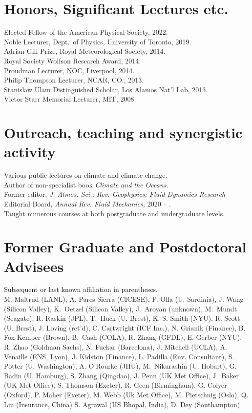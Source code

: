 \documentclass[11pt]{article}
\begin{document}
\section*{Honors, Significant Lectures etc.}
Elected Fellow of the American Physical Society, 2022. \\
Noble Lecturer, Dept.\ of Physics,  University of Toronto, 2019.\\
Adrian Gill Prize, Royal Meteorological Society, 2014. \\
Royal Society Wolfson Research Award, 2014. \\
Proudman Lecturer, NOC, Liverpool, 2014. \\
Philip Thompson Lecturer, NCAR, CO., 2013. \\
Stanislaw Ulam Distinguished Scholar, Los Alamos Nat'l Lab, 2013. \\
Victor Starr Memorial Lecturer, MIT, 2008.


\section*{Outreach, teaching and synergistic activity}
Various public lectures on climate and climate change.\\
Author of non-specialist book \textit{Climate and the Oceans}.\\
Former editor, \textit{J. Atmos. Sci.;  Rev. Geophysics; Fluid Dynamics Research}\\
Editorial Board,  \textit{Annual Rev. Fluid Mechanics,} 2020 -- .  \\  
Taught numerous courses at both postgraduate and undergraduate levels.


\section*{Former Graduate and Postdoctoral Advisees} 
Subsequent or last known affiliation in parentheses. \\
M. Maltrud (LANL), A. Pares-Sierra (CICESE), P. Olla (U. Sardinia), J. Wang (Silicon Valley), K.~Oetzel (Silicon Valley), J.~Aroyan (unknown), M.~Mundt (Seagate), R. Raskin (JPL), T.~Huck (U. Brest), K. S. Smith (NYU), R. Scott (U. Brest), J. Loving (ret'd), C. Cartwright (ICF Inc.), N. Grianik (Finance), B. Fox-Kemper (Brown), B.~Cash (COLA), R. Zhang (GFDL), E. Gerber (NYU), R. Zhao (Goldman Sachs), N. Fuckar (Barcelona), J. Mitchell (UCLA), A. Venaille (ENS, Lyon), J. Kidston (Finance), L. Padilla (Env. Consultant), S. Potter (U. Washington), A. O'Rourke (JHU),  M.~Nikurashin (U. Hobart), G. Badin (U. Hamburg), S. Zhang (Qingdao),  J. Penn (UK Met Office), J.~Baker (UK Met Office),  S. Thomson (Exeter),  R. Geen (Birmingham),  G. Colyer (Oxford), P. Maher (Exeter), M. Webb (Uk Met Office), M. Pietschnig (Oslo), Q. Liu (Insurance, China) S. Agrawal (IIS Bhopal, India), D. Dey (Southampton) 
\end{document}

